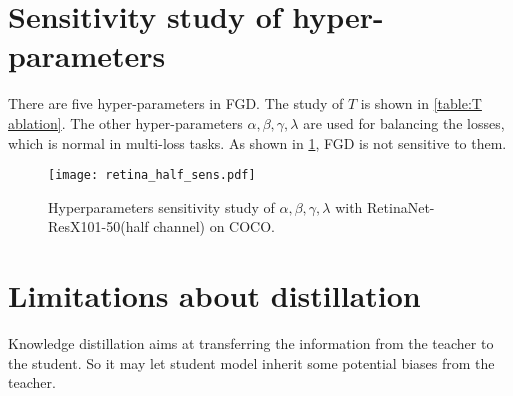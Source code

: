 \documentclass[10pt,twocolumn,letterpaper]{article}
\begin{document}
\section{Sensitivity study of hyper-parameters}
There are five hyper-parameters in FGD. The study of $T$ is shown in \cref{table:T ablation}. The other hyper-parameters $\alpha,\beta,\gamma,\lambda$ are used for balancing the losses, which is normal in multi-loss tasks. As shown in \cref{figure:sens}, FGD is not sensitive to them.

\begin{figure}
  \centering
  \texttt{[image: retina\_half\_sens.pdf]}
  \caption{Hyperparameters sensitivity study of $\alpha, \beta, \gamma, \lambda$ with RetinaNet-ResX101-50(half channel) on COCO.}
  \label{figure:sens}
\end{figure}

\section{Limitations about distillation}
Knowledge distillation aims at transferring the information from the teacher to the student. So it may let student model inherit some potential biases from the teacher.
\end{document}
